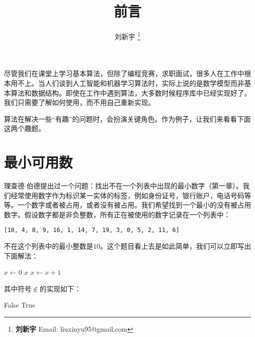 \documentclass[b5paper]{ctexart}
\begin{document}

\title{前言}

\author{刘新宇
\thanks{{\bfseries 刘新宇} \newline
  Email: liuxinyu95@gmail.com \newline}
  }

\maketitle
\fi


尽管我们在课堂上学习基本算法，但除了编程竞赛，求职面试，很多人在工作中根本用不上。当人们谈到人工智能和机器学习算法时，实际上说的是数学模型而非基本算法和数据结构。即使在工作中遇到算法，大多数时候程序库中已经实现好了。我们只需要了解如何使用，而不用自己重新实现。

算法在解决一些“有趣”的问题时，会扮演关键角色。作为例子，让我们来看看下面这两个趣题。

\section{最小可用数}
\label{min-free} 

理查德$\cdot$伯德提出过一个问题：找出不在一个列表中出现的最小数字（\cite{fp-pearls}第一章）。我们经常使用数字作为标识某一实体的标签，例如身份证号，银行账户，电话号码等等。一个数字或者被占用，或者没有被占用。我们希望找到一个最小的没有被占用数字。假设数字都是非负整数，所有正在被使用的数字记录在一个列表中：

\begin{verbatim}
[18, 4, 8, 9, 16, 1, 14, 7, 19, 3, 0, 5, 2, 11, 6]
\end{verbatim}

不在这个列表中的最小整数是10。这个题目看上去是如此简单，我们可以立即写出下面解法：

\begin{algorithmic}[1]
  \State $x \gets 0$
  \Loop
      \State \Return $x$
    \Else
      \State $x \gets x + 1$
    \EndIf
  \EndLoop
\EndFunction
\end{algorithmic}

其中符号$\notin$的实现如下：

\begin{algorithmic}[1]
      \State \Return False
    \EndIf
  \EndFor
  \State \Return True
\EndFunction
\end{algorithmic}
\end{document}
